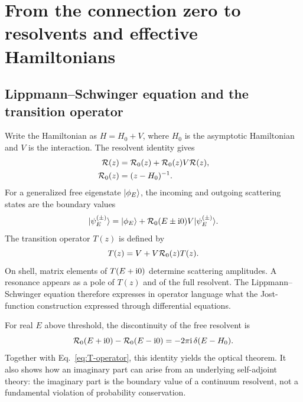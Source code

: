 \section{From the connection zero to resolvents and effective Hamiltonians}
\label{sec:scattering}

\subsection{Lippmann--Schwinger equation and the transition operator}
\label{subsec:lippmann-schwinger}

Write the Hamiltonian as $H=H_0+V$, where $H_0$ is the asymptotic Hamiltonian
and $V$ is the interaction.  The resolvent identity gives
\begin{align}
  \mathcal{R}(z)
  &=\mathcal{R}_0(z)
  +\mathcal{R}_0(z)V\mathcal{R}(z),
  \label{eq:resolvent-identity}\\
  \mathcal{R}_0(z)&=(z-H_0)^{-1} .
\end{align}
For a generalized free eigenstate $\lvert \phi_E \rangle$, the incoming and outgoing
scattering states are the boundary values
\begin{equation}
  \lvert \psi_E^{(\pm)} \rangle
  =\lvert \phi_E \rangle
  +\mathcal{R}_0(E\pm\mathrm{i}0)V\lvert \psi_E^{(\pm)} \rangle .
  \label{eq:lippmann-schwinger}
\end{equation}
The transition operator $T(z)$ is defined by
\begin{equation}
  T(z)=V+V\mathcal{R}_0(z)T(z) .
  \label{eq:T-operator}
\end{equation}
On shell, matrix elements of $T(E+\mathrm{i}0)$ determine scattering amplitudes.  A
resonance appears as a pole of $T(z)$ and of the full resolvent.  The
Lippmann--Schwinger equation therefore expresses in operator language what the
Jost-function construction expressed through differential equations.

For real $E$ above threshold, the discontinuity of the free resolvent is
\begin{equation}
  \mathcal{R}_0(E+\mathrm{i}0)-\mathcal{R}_0(E-\mathrm{i}0)
  =-2\pi\mathrm{i}\,\delta(E-H_0) .
  \label{eq:resolvent-discontinuity}
\end{equation}
Together with Eq.~\eqref{eq:T-operator}, this identity yields the optical
theorem.  It also shows how an imaginary part can arise from an underlying
self-adjoint theory: the imaginary part is the boundary value of a continuum
resolvent, not a fundamental violation of probability conservation.

